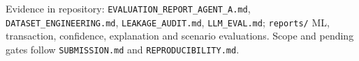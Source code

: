 \documentclass[10pt,a4paper]{article}
\begin{document}
\vfill
{\footnotesize\color{gray}Evidence in repository: \texttt{EVALUATION\_REPORT\_AGENT\_A.md}, \texttt{DATASET\_ENGINEERING.md}, \texttt{LEAKAGE\_AUDIT.md}, \texttt{LLM\_EVAL.md}; \texttt{reports/} ML, transaction, confidence, explanation and scenario evaluations. Scope and pending gates follow \texttt{SUBMISSION.md} and \texttt{REPRODUCIBILITY.md}.}
\end{document}
